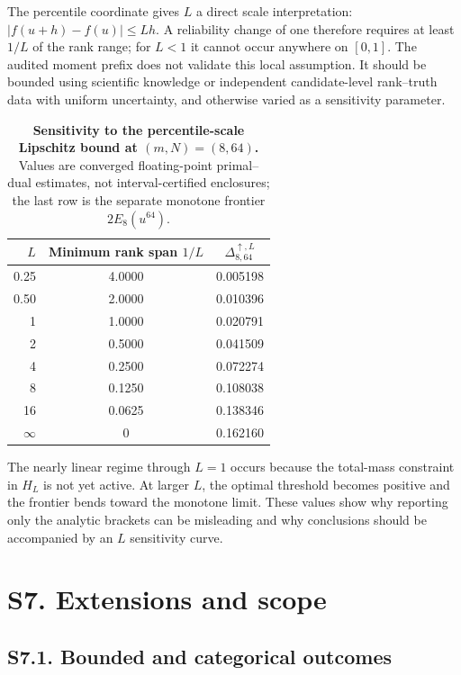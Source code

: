 \documentclass[10pt,twocolumn]{article}
\begin{document}
The percentile coordinate gives $L$ a direct scale interpretation:
$|f(u+h)-f(u)|\le Lh$. A reliability change of one therefore requires at
least $1/L$ of the rank range; for $L<1$ it cannot occur anywhere on
$[0,1]$. The audited moment prefix does not validate this local assumption.
It should be bounded using scientific knowledge or independent candidate-level
rank--truth data with uniform uncertainty, and otherwise varied as a
sensitivity parameter.

\begin{table}[h]
\centering
\caption{\textbf{Sensitivity to the percentile-scale Lipschitz bound at $(m,N)=(8,64)$.} Values are converged floating-point primal--dual estimates, not interval-certified enclosures; the last row is the separate monotone frontier $2E_8(u^{64})$.}
\label{si:tab:lipschitz-sensitivity}
\begin{tabular}{rcc}
\toprule
$L$ & Minimum rank span $1/L$ & $\Delta^{\uparrow,L}_{8,64}$ \\
\midrule
0.25 & 4.0000 & 0.005198 \\
0.50 & 2.0000 & 0.010396 \\
1    & 1.0000 & 0.020791 \\
2    & 0.5000 & 0.041509 \\
4    & 0.2500 & 0.072274 \\
8    & 0.1250 & 0.108038 \\
16   & 0.0625 & 0.138346 \\
$\infty$ & 0 & 0.162160 \\
\bottomrule
\end{tabular}
\end{table}

The nearly linear regime through $L=1$ occurs because the total-mass
constraint in $H_L$ is not yet active. At larger $L$, the optimal threshold
becomes positive and the frontier bends toward the monotone limit. These
values show why reporting only the analytic brackets can be misleading and
why conclusions should be accompanied by an $L$ sensitivity curve.

\section*{S7. Extensions and scope}

\subsection*{S7.1. Bounded and categorical outcomes}
\end{document}
